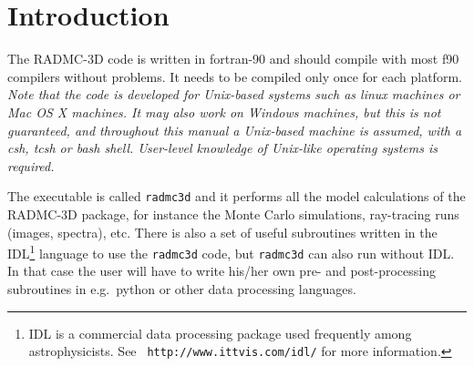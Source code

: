 \documentclass{report}
\begin{document}
\section{Introduction}
The RADMC-3D code is written in fortran-90 and should compile with most f90
compilers without problems. It needs to be compiled only once for each
platform. {\em Note that the code is developed for Unix-based systems such
  as linux machines or Mac OS X machines. It may also work on Windows
  machines, but this is not guaranteed, and throughout this manual a
  Unix-based machine is assumed, with a csh, tcsh or bash shell. User-level
  knowledge of Unix-like operating systems is required.}

The executable is called {\small\tt radmc3d} and it performs all the model
calculations of the RADMC-3D package, for instance the Monte Carlo
simulations, ray-tracing runs (images, spectra), etc. There is also a set of
useful subroutines written in the IDL\footnote{IDL is a commercial data
  processing package used frequently among astrophysicists. See {\small\tt
    http://www.ittvis.com/idl/} for more information.} language to use the
{\small\tt radmc3d} code, but {\small\tt radmc3d} can also run without
IDL. In that case the user will have to write his/her own pre- and
post-processing subroutines in e.g.\ python or other data processing
languages.
\end{document}
